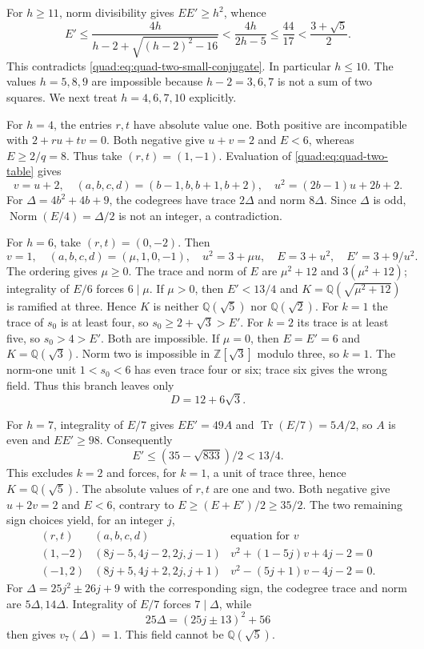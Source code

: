 \documentclass[11pt,a4paper]{article}
\theoremstyle{definition}\newtheorem{definition}[theorem]{Definition}
\theoremstyle{remark}\newtheorem{remark}[theorem]{Remark}
\newcommand{\Q}{\mathbb Q}
\newcommand{\ZZ}{\mathbb Z}
\numberwithin{equation}{section}
\begin{document}
For $h\ge11$, norm divisibility gives $EE'\ge h^2$, whence
\[
 E'\le\frac{4h}{h-2+\sqrt{(h-2)^2-16}}
    <\frac{4h}{2h-5}\le\frac{44}{17}
    <\frac{3+\sqrt5}{2}.
\]
This contradicts \eqref{quad:eq:quad-two-small-conjugate}.
In particular $h\le10$. The values $h=5,8,9$ are impossible because $h-2=3,6,7$ is not
a sum of two squares. We next treat $h=4,6,7,10$ explicitly.

For $h=4$, the entries $r,t$ have absolute value one. Both positive
are incompatible with $2+ru+tv=0$. Both negative give $u+v=2$
and $E<6$, whereas $E\ge2/q=8$. Thus take $(r,t)=(1,-1)$.
Evaluation of \eqref{quad:eq:quad-two-table} gives
\[
 v=u+2,\quad(a,b,c,d)=(b-1,b,b+1,b+2),\quad
 u^2=(2b-1)u+2b+2.
\]
For $\Delta=4b^2+4b+9$, the codegrees have trace $2\Delta$ and
norm $8\Delta$. Since $\Delta$ is odd,
$\operatorname{Norm}(E/4)=\Delta/2$ is not an integer, a contradiction.

For $h=6$, take $(r,t)=(0,-2)$. Then
\[
 v=1,\quad(a,b,c,d)=(\mu,1,0,-1),\quad
 u^2=3+\mu u,\quad E=3+u^2,\quad E'=3+9/u^2.
\]
The ordering gives $\mu\ge0$. The trace and norm of $E$ are
$\mu^2+12$ and $3(\mu^2+12)$; integrality of $E/6$ forces
$6\mid\mu$. If $\mu>0$, then $E'<13/4$ and
$K=\Q(\sqrt{\mu^2+12})$ is ramified at three. Hence
$K$ is neither $\Q(\sqrt5)$ nor $\Q(\sqrt2)$.
For $k=1$ the trace of $s_0$ is at least four, so
$s_0\ge2+\sqrt3>E'$. For $k=2$ its trace is at least five, so
$s_0>4>E'$. Both are impossible.
If $\mu=0$, then $E=E'=6$ and $K=\Q(\sqrt3)$.
Norm two is impossible in $\ZZ[\sqrt3]$ modulo three,
so $k=1$. The norm-one unit $1<s_0<6$ has even trace four or six;
trace six gives the wrong field. Thus this branch leaves only
\begin{equation}\label{quad:eq:quad-two-residual-three}
 D=12+6\sqrt3.
\end{equation}

For $h=7$, integrality of $E/7$ gives $EE'=49A$ and
$\operatorname{Tr}(E/7)=5A/2$, so $A$ is even and $EE'\ge98$.
Consequently
\[
 E'\le(35-\sqrt{833})/2<13/4.
\]
This excludes $k=2$ and forces, for $k=1$, a unit of trace three,
hence $K=\Q(\sqrt5)$. The absolute values of $r,t$ are
one and two. Both negative give $u+2v=2$ and $E<6$, contrary to
$E\ge(E+E')/2\ge35/2$.
The two remaining sign choices yield, for an integer $j$,
\[
\begin{array}{c|c|c}
(r,t)&(a,b,c,d)&\text{equation for }v\\\hline
(1,-2)&(8j-5,4j-2,2j,j-1)&v^2+(1-5j)v+4j-2=0\\
(-1,2)&(8j+5,4j+2,2j,j+1)&v^2-(5j+1)v-4j-2=0.
\end{array}
\]
For $\Delta=25j^2\pm26j+9$ with the corresponding sign, the
codegree trace and norm are $5\Delta,14\Delta$.
Integrality of $E/7$ forces $7\mid\Delta$, while
\[
 25\Delta=(25j\pm13)^2+56
\]
then gives $v_7(\Delta)=1$. This field cannot be $\Q(\sqrt5)$.
\end{document}
